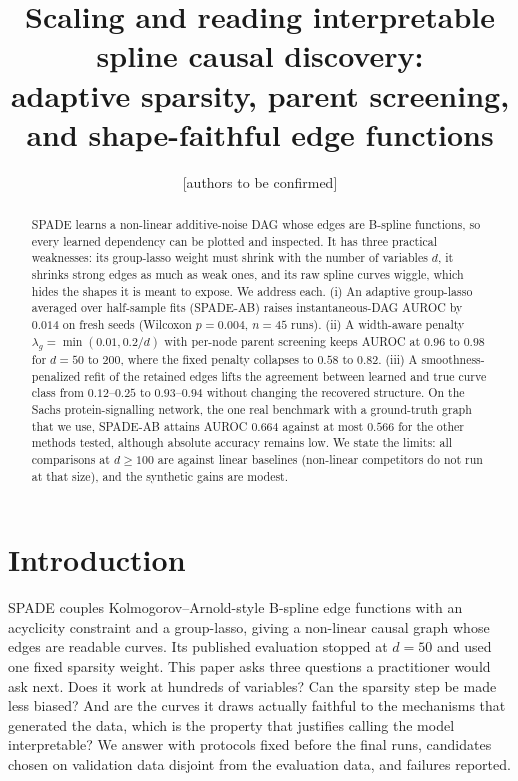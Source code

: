 \documentclass[11pt]{article}
\title{Scaling and reading interpretable spline causal discovery:\\
adaptive sparsity, parent screening, and shape-faithful edge functions}
\author{[authors to be confirmed]}
\date{}
\begin{document}
\maketitle

\begin{abstract}
SPADE learns a non-linear additive-noise DAG whose edges are B-spline functions, so every learned
dependency can be plotted and inspected. It has three practical weaknesses: its group-lasso weight must
shrink with the number of variables $d$, it shrinks strong edges as much as weak ones, and its raw spline
curves wiggle, which hides the shapes it is meant to expose. We address each. (i) An adaptive group-lasso
averaged over half-sample fits (SPADE-AB) raises instantaneous-DAG AUROC by $0.014$ on fresh seeds
(Wilcoxon $p=0.004$, $n=45$ runs). (ii) A width-aware penalty $\lambda_g=\min(0.01,0.2/d)$ with
per-node parent screening keeps AUROC at $0.96$ to $0.98$ for $d=50$ to $200$, where the fixed
penalty collapses to $0.58$ to $0.82$. (iii) A smoothness-penalized refit of the retained edges lifts the
agreement between learned and true curve class from $0.12$--$0.25$ to $0.93$--$0.94$ without changing the
recovered structure. On the Sachs protein-signalling network, the one real benchmark with a ground-truth graph that
we use, SPADE-AB attains AUROC $0.664$ against at most $0.566$ for the other methods tested, although absolute
accuracy remains low. We state the limits: all comparisons at $d\ge100$ are against linear baselines
(non-linear competitors do not run at that size), and the synthetic gains are modest.
\end{abstract}

\section{Introduction}
SPADE \citep{Dang2026spade} couples Kolmogorov--Arnold-style B-spline edge functions \citep{Liu2024} with
an acyclicity constraint \citep{Zheng2018} and a group-lasso, giving a non-linear causal graph whose edges
are readable curves. Its published evaluation stopped at $d=50$ and used one fixed sparsity weight. This
paper asks three questions a practitioner would ask next. Does it work at hundreds of variables? Can the
sparsity step be made less biased? And are the curves it draws actually faithful to the mechanisms that
generated the data, which is the property that justifies calling the model interpretable? We answer with
protocols fixed before the final runs, candidates chosen on validation data disjoint from the evaluation
data, and failures reported.
\end{document}
